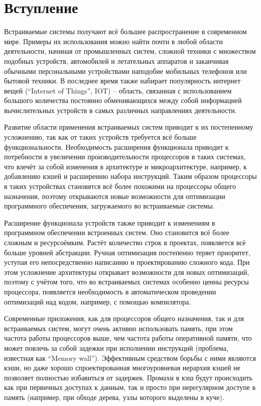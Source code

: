 \documentclass[12pt,a4paper,oneside]{article}
\begin{document}
\tableofcontents
\newpage

\section{Вступление}

\indent

Встраиваемые системы получают всё большее распространение в современном мире. Примеры их использования можно найти почти в любой области деятельности, начиная от промышленных систем, сложной техники с множеством подобных устройств, автомобилей и летательных аппаратов и заканчивая обычными персональными устройствами наподобие мобильных телефонов или бытовой техники. В последнее время также набирает популярность интернет вещей (``Internet of Things'', IOT) -- область, связанная с использованием большого количества постоянно обменивающихся между собой информацией вычислительных устройств в самых различных направлениях деятельности\cite{EET}.

Развитие области применения встраиваемых систем приводит к их постепенному усложнению, так как от таких устройств требуется всё больше функциональности. Необходимость расширения функционала приводит к потребности в увеличении производительности процессоров в таких системах, что влечёт за собой изменения в архитектуре и микроархитектуре, например, к добавлению кэшей и расширению набора инструкций. Таким образом процессоры в таких устройствах становятся всё более похожими на процессоры общего назначения, поэтому открываются новые возможности для оптимизации программного обеспечения, загружаемого во встраиваемые системы\cite{EET}.

Расширение функционала устройств также приводит к изменениям в программном обеспечении встроенных систем. Оно становится всё более сложным и ресурсоёмким. Растёт количество строк в проектах, появляется всё больше уровней абстракции. Ручная оптимизация постепенно теряет приоритет, уступая его непосредственно написанию и проектированию сложного кода. При этом усложнение архитектуры открывает возможности для новых оптимизаций, поэтому с учётом того, что во встраиваемых системах особенно ценны ресурсы процессора, появляется необходимость в автоматическом проведении оптимизаций над кодом, например, с помощью компилятора\cite{EET}\cite{Complex}.

Современные приложения, как для процессоров общего назначения, так и для встраиваемых систем, могут очень активно использовать память, при этом частота работы процессоров выше, чем частота работы оперативной памяти, что может повлечь за собой задежки при исполнении инструкций (проблема, известная как ``Memory wall''). Эффективным средством борьбы с ними являются кэши, но даже хорошо спроектированная многоуровневая иерархия кэшей не позволяет полностью избавиться от задержек. Промахи в кэш будут происходить как при первичных доступах к данным, так и просто при нерегулярном доступе в память (например, при обходе дерева, узлы которого выделены в куче)\cite{Bour2010}\cite{Ferdman:2012}.
\end{document}

